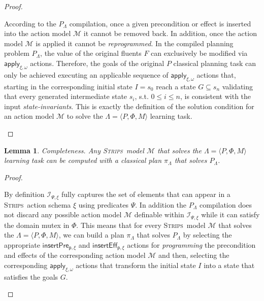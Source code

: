 \documentclass{article}
\newcommand{\tup}[1]{{\langle #1 \rangle}}
\newcommand{\strips}{\textsc{Strips}}
\newtheorem{mylemma}[mytheorem]{Lemma}
\begin{document}
\begin{proof}[Proof]
\begin{small}
According to the $P_{\Lambda}$ compilation, once a given precondition or effect is inserted into the action model $\mathcal{M}$ it cannot be removed back. In addition, once the action model $\mathcal{M}$ is applied it cannot be {\em reprogrammed}. In the compiled planning problem $P_{\Lambda}$, the value of the original fluents $F$ can exclusively be modified via $\mathsf{apply_{\xi,\omega}}$ actions.  Therefore, the goals of the original $P$ classical planning task can only be achieved executing an applicable sequence of $\mathsf{apply_{\xi,\omega}}$ actions that, starting in the corresponding initial state $I=s_0$ reach a state $G \subseteq s_n$ validating that every generated intermediate state $s_i$, s.t. $0\leq i\leq n$, is consistent with the input {\em state-invariants}. This is exactly the definition of the solution condition for an action model $\mathcal{M}$ to solve the $\Lambda=\tup{P,\Phi,M}$ learning task. 
\end{small}
\end{proof}

\begin{mylemma}
Completeness. Any \strips\ model $\mathcal{M}$ that solves the $\Lambda=\tup{P,\Phi,M}$ learning task can be computed with a classical plan $\pi_{\Lambda}$ that solves $P_{\Lambda}$.
\end{mylemma}

\begin{proof}[Proof]
\begin{small}
By definition ${\mathcal I}_{\Psi,\xi}$ fully captures the set of elements that can appear in a \strips\ action schema $\xi$ using predicates $\Psi$. In addition the $P_{\Lambda}$ compilation does not discard any possible action model $\mathcal{M}$ definable within ${\mathcal I}_{\Psi,\xi}$ while it can satisfy the domain mutex in $\Phi$. This means that for every \strips\ model $\mathcal{M}$ that solves the $\Lambda=\tup{P,\Phi,M}$, we can build a plan $\pi_{\Lambda}$ that solves $P_{\Lambda}$ by selecting the appropriate $\mathsf{insertPre_{p,\xi}}$ and $\mathsf{insertEff_{p,\xi}}$ actions for {\em programming} the precondition and effects of the corresponding action model $\mathcal{M}$ and then, selecting the corresponding $\mathsf{apply_{\xi,\omega}}$ actions that transform the initial state $I$ into a state that satisfies the goals $G$.
\end{small}
\end{proof}
\end{document}
